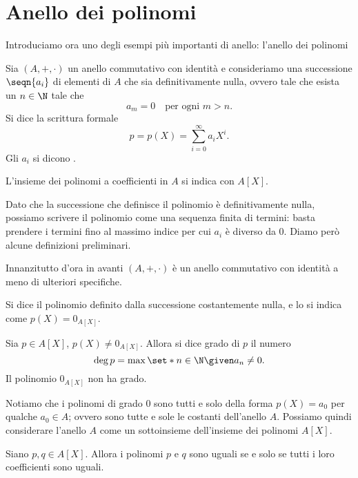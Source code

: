 \section{Anello dei polinomi}

Introduciamo ora uno degli esempi più importanti di anello: l'anello dei polinomi

\begin{definition}
    Sia $(A, +, \cdot)$ un anello commutativo con identità e consideriamo una successione $\seqn{a_i}$ di elementi di $A$ che sia definitivamente nulla, ovvero tale che esista un $n \in \N$ tale che \[
        a_m = 0 \quad \text{per ogni } m > n.    
    \]
    Si dice  la scrittura formale \[
        p = p(X) = \sum_{i = 0}^{\infty} a_iX^i.    
    \] Gli $a_i$ si dicono .

    L'insieme dei polinomi a coefficienti in $A$ si indica con $A[X]$.
\end{definition}

Dato che la successione che definisce il polinomio è definitivamente nulla, possiamo scrivere il polinomio come una sequenza finita di termini: basta prendere i termini fino al massimo indice per cui $a_i$ è diverso da $0$. Diamo però alcune definizioni preliminari.

Innanzitutto d'ora in avanti $(A, +, \cdot)$ è un anello commutativo con identità a meno di ulteriori specifiche.

\begin{definition}
    Si dice  il polinomio definito dalla successione costantemente nulla, e lo si indica come $p(X) = 0_{A[X]}$.
\end{definition}

\begin{definition}
    Sia $p \in A[X]$, $p(X) \neq 0_{A[X]}$. Allora si dice grado di $p$ il numero \[
        \deg p = \max \set*{n \in \N \given a_n \neq 0}.    
    \] Il polinomio $0_{A[X]}$ non ha grado.
\end{definition}

Notiamo che i polinomi di grado $0$ sono tutti e solo della forma $p(X) = a_0$ per qualche $a_0 \in A$; ovvero sono tutte e sole le costanti dell'anello $A$. Possiamo quindi considerare l'anello $A$ come un sottoinsieme dell'insieme dei polinomi $A[X]$.

\begin{definition}
    Siano $p, q \in A[X]$. Allora i polinomi $p$ e $q$ sono uguali se e solo se tutti i loro coefficienti sono uguali.
\end{definition}

